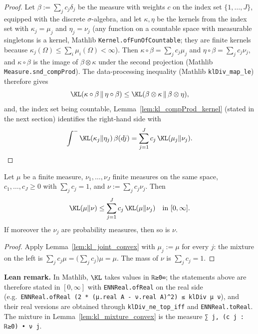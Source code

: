 \begin{proof}
\leanok
{}
Let $\beta := \sum_j c_j\delta_j$ be the measure with weights $c$ on the index set
$\{1,\dots,J\}$, equipped with the discrete $\sigma$-algebra, and let $\kappa,\eta$ be the kernels
from the index set with $\kappa_j = \mu_j$ and $\eta_j = \nu_j$ (any function on a countable space
with measurable singletons is a kernel, Mathlib \texttt{Kernel.ofFunOfCountable}; they are finite
kernels because $\kappa_j(\Omega) \le \sum_i \mu_i(\Omega) < \infty$). Then
$\kappa\circ\beta = \sum_j c_j\mu_j$ and $\eta\circ\beta = \sum_j c_j\nu_j$, and $\kappa\circ\beta$
is the image of $\beta\otimes\kappa$ under the second projection (Mathlib
\texttt{Measure.snd\_compProd}). The data-processing inequality (Mathlib \texttt{klDiv\_map\_le})
therefore gives
\[
  \KL(\kappa\circ\beta \,\|\, \eta\circ\beta) \le \KL(\beta\otimes\kappa \,\|\, \beta\otimes\eta) ,
\]
and, the index set being countable, Lemma~\ref{lem:kl_compProd_kernel} (stated in the next
section) identifies the right-hand side with
\[
  \int^{-} \KL(\kappa_j\|\eta_j)\,\beta(dj) = \sum_{j=1}^J c_j\,\KL(\mu_j\|\nu_j) .
\]
\end{proof}

\begin{lemma}\label{lem:kl_mixture_convex}
\leanok
Let $\mu$ be a finite measure, $\nu_1,\dots,\nu_J$ finite measures on the same space,
$c_1,\dots,c_J \ge 0$ with $\sum_j c_j = 1$, and $\nu := \sum_j c_j\nu_j$. Then
\[
  \KL(\mu\|\nu) \le \sum_{j=1}^J c_j\,\KL(\mu\|\nu_j) \quad\text{in } [0,\infty].
\]
If moreover the $\nu_j$ are probability measures, then so is $\nu$.
\end{lemma}

\begin{proof}
\leanok
{}
Apply Lemma~\ref{lem:kl_joint_convex} with $\mu_j := \mu$ for every $j$: the mixture on the left
is $\sum_j c_j\mu = \big(\sum_j c_j\big)\mu = \mu$. The mass of $\nu$ is $\sum_j c_j = 1$.
\end{proof}

\textbf{Lean remark.} In Mathlib, $\KL$ takes values in \texttt{ℝ≥0∞}; the statements above
are therefore stated in $[0,\infty]$ with \texttt{ENNReal.ofReal} on the real side (e.g.\
\texttt{ENNReal.ofReal (2 * (μ.real A - ν.real A)\^{}2) ≤ klDiv μ ν}), and their real versions are
obtained through \texttt{klDiv\_ne\_top\_iff} and \texttt{ENNReal.toReal}. The mixture in
Lemma~\ref{lem:kl_mixture_convex} is the measure \texttt{∑ j, (c j : ℝ≥0) • ν j}.

